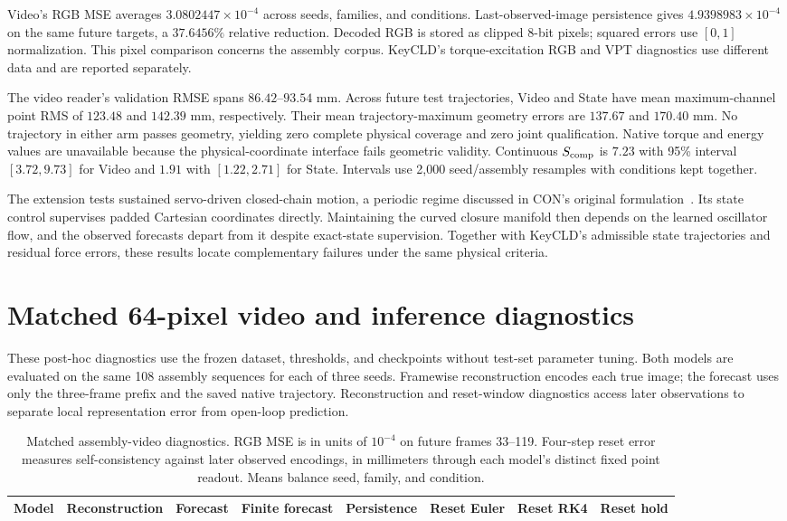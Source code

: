 \documentclass[10pt,twocolumn,letterpaper]{article}
\begin{document}
Video's RGB MSE averages $3.0802447\times10^{-4}$ across seeds, families, and conditions. Last-observed-image persistence gives $4.9398983\times10^{-4}$ on the same future targets, a $37.6456\%$ relative reduction. Decoded RGB is stored as clipped 8-bit pixels; squared errors use $[0,1]$ normalization. This pixel comparison concerns the assembly corpus. KeyCLD's torque-excitation RGB and VPT diagnostics use different data and are reported separately.

The video reader's validation RMSE spans $86.42$--$93.54$ mm. Across future test trajectories, Video and State have mean maximum-channel point RMS of $123.48$ and $142.39$ mm, respectively. Their mean trajectory-maximum geometry errors are $137.67$ and $170.40$ mm. No trajectory in either arm passes geometry, yielding zero complete physical coverage and zero joint qualification. Native torque and energy values are unavailable because the physical-coordinate interface fails geometric validity. Continuous $S_{\rm comp}$ is $7.23$ with 95\% interval $[3.72,9.73]$ for Video and $1.91$ with $[1.22,2.71]$ for State. Intervals use 2,000 seed/assembly resamples with conditions kept together.

The extension tests sustained servo-driven closed-chain motion, a periodic regime discussed in CON's original formulation~\cite{stolzle2024con}. Its state control supervises padded Cartesian coordinates directly. Maintaining the curved closure manifold then depends on the learned oscillator flow, and the observed forecasts depart from it despite exact-state supervision. Together with KeyCLD's admissible state trajectories and residual force errors, these results locate complementary failures under the same physical criteria.


\section{Matched 64-pixel video and inference diagnostics}
\label{app:matched-video}
These post-hoc diagnostics use the frozen dataset, thresholds, and checkpoints without test-set parameter tuning. Both models are evaluated on the same 108 assembly sequences for each of three seeds. Framewise reconstruction encodes each true image; the forecast uses only the three-frame prefix and the saved native trajectory. Reconstruction and reset-window diagnostics access later observations to separate local representation error from open-loop prediction.

\begin{table}[t]
\caption{Matched assembly-video diagnostics. RGB MSE is in units of $10^{-4}$ on future frames 33--119. Four-step reset error measures self-consistency against later observed encodings, in millimeters through each model's distinct fixed point readout. Means balance seed, family, and condition.}
\label{app:matched-video-table}
\centering\small
\begin{tabular}{lrrrrrrr}
\toprule
Model & Reconstruction & Forecast & Finite forecast & Persistence & Reset Euler & Reset RK4 & Reset hold\\
\midrule

\bottomrule
\end{tabular}
\end{table}
\end{document}
